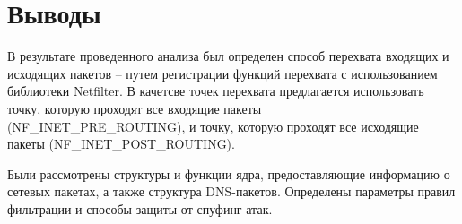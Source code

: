 


\section{Выводы}

В результате проведенного анализа был определен способ перехвата входящих и исходящих пакетов -- путем регистрации функций перехвата с использованием библиотеки Netfilter. В качетсве точек перехвата предлагается использовать точку, которую проходят все входящие пакеты \\(NF\_INET\_PRE\_ROUTING), и точку, которую проходят все исходящие пакеты (NF\_INET\_POST\_ROUTING).

Были рассмотрены структуры и функции ядра, предоставляющие  информацию о сетевых пакетах, а также структура DNS-пакетов. Определены параметры правил фильтрации и способы защиты от спуфинг-атак.
